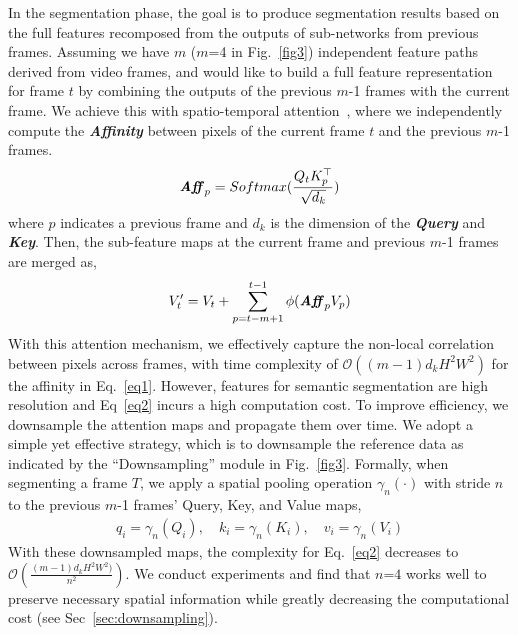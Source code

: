 \documentclass[10pt,twocolumn,letterpaper]{article}
\makeatletter
\renewcommand{\paragraph}{\@startsection{paragraph}{4}{\z@}{2.25ex \@plus 1ex \@minus .2ex}{-1em}{\normalfont\normalsize\bfseries}}
\makeatother
\begin{document}
In the segmentation phase, the goal is to produce segmentation results based on the full features recomposed from the outputs of sub-networks from previous frames. 
Assuming we have $m$ ($m$=4 in Fig.~\ref{fig3}) independent feature paths derived from video frames, and would like to build a full feature representation for frame $t$ by combining the outputs of the previous $m$-1 frames with the current frame.
We achieve this with spatio-temporal attention~\cite{wang2018non,oh2019video}, where we independently compute the \textit{\textbf{Affinity}} between pixels of the current frame $t$ and the previous $m$-1 frames. 
\begin{equation}
\label{eq1}
\begin{split}
\textbf{\textit{Aff}}_{p}= Softmax(\frac{Q_t K_p^{\top}}{\sqrt{d_k}})
\end{split}
\end{equation}
\noindent where $\textit{p}$ indicates a previous frame and $d_k$ is the dimension of the \textbf{\textit{Query}} and \textbf{\textit{Key}}. 
Then, the sub-feature maps at the current frame and previous $m$-1 frames are merged as,
\begin{equation}
\label{eq2}
\begin{split}
V'_{t}= V_t + \sum_{p=t-m+1}^{t-1}\phi(\textbf{\textit{Aff}}_{p} V_p)
\end{split}
\end{equation}
With this attention mechanism, we effectively capture the non-local correlation between pixels across frames, with time complexity of $\mathcal{O}((m-1)d_k H^2W^2)$ for the affinity in Eq.~\ref{eq1}. 
However, features for semantic segmentation are high resolution and Eq~\ref{eq2} incurs a high computation cost.
To improve efficiency, we downsample the attention maps and propagate them over time. 
\paragraph{Attention Downsampling.} We adopt a simple yet effective strategy, which is to downsample the reference data as indicated by the ``Downsampling'' module in Fig.~\ref{fig3}. 
Formally, when segmenting a frame $T$, we apply a spatial pooling operation $\gamma_n (\cdot)$ with stride $n$ to the previous $m$-1 frames' Query, Key, and Value maps,
\begin{equation}
\label{eq3}
\begin{split}
q_i =  \gamma_n(Q_i), \quad k_i =  \gamma_n(K_i), \quad v_i =  \gamma_n(V_i)
\end{split}
\end{equation}
With these downsampled maps, the complexity for Eq.~\ref{eq2} decreases to  $\mathcal{O}(\frac{(m-1)d_k H^2W^2)}{n^2})$. 
We conduct experiments and find that $n$=$4$ works well to preserve necessary spatial information while greatly decreasing the computational cost (see Sec~\ref{sec:downsampling}).
\end{document}
